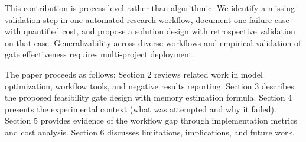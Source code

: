 This contribution is process-level rather than algorithmic. We identify a missing validation step in one automated research workflow, document one failure case with quantified cost, and propose a solution design with retrospective validation on that case. Generalizability across diverse workflows and empirical validation of gate effectiveness requires multi-project deployment.

The paper proceeds as follows: Section 2 reviews related work in model optimization, workflow tools, and negative results reporting. Section 3 describes the proposed feasibility gate design with memory estimation formula. Section 4 presents the experimental context (what was attempted and why it failed). Section 5 provides evidence of the workflow gap through implementation metrics and cost analysis. Section 6 discusses limitations, implications, and future work.

